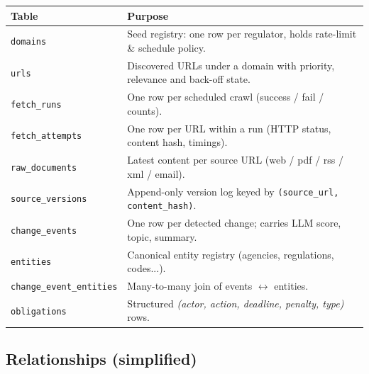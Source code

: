 \documentclass[11pt,a4paper]{article}
\begin{document}
\begin{center}
\small
\begin{tabularx}{\linewidth}{@{}lX@{}}
\toprule
\textbf{Table} & \textbf{Purpose} \\
\midrule
\texttt{domains}             & Seed registry: one row per regulator, holds rate-limit \& schedule policy. \\
\texttt{urls}                & Discovered URLs under a domain with priority, relevance and back-off state. \\
\texttt{fetch\_runs}          & One row per scheduled crawl (success / fail / counts). \\
\texttt{fetch\_attempts}      & One row per URL within a run (HTTP status, content hash, timings). \\
\midrule
\texttt{raw\_documents}       & Latest content per source URL (web / pdf / rss / xml / email). \\
\texttt{source\_versions}     & Append-only version log keyed by \texttt{(source\_url, content\_hash)}. \\
\texttt{change\_events}       & One row per detected change; carries LLM score, topic, summary. \\
\midrule
\texttt{entities}            & Canonical entity registry (agencies, regulations, codes...). \\
\texttt{change\_event\_entities}& Many-to-many join of events $\leftrightarrow$ entities. \\
\texttt{obligations}         & Structured \emph{(actor, action, deadline, penalty, type)} rows. \\
\bottomrule
\end{tabularx}
\end{center}

\subsection{Relationships (simplified)}

\begin{center}
\end{center}
\end{document}

